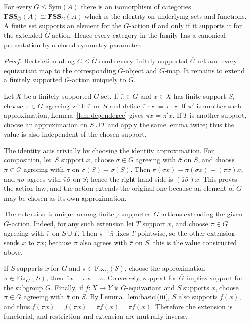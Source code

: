 \documentclass{lmcs}
\newcommand{\Sym}{\mathrm{Sym}}
\newcommand{\Fix}{\mathrm{Fix}}
\newcommand{\FSS}{\mathbf{FSS}}
\begin{document}
\begin{thm}\label{thm:closure}
For every $G\leq\Sym(A)$ there is an isomorphism of categories
$\FSS_{\overline G}(A)\cong\FSS_G(A)$
which is the identity on underlying sets and functions. A finite set
supports an element for the $G$-action if and only if it supports it for
the extended $\overline G$-action. Hence every category in the
family has a canonical presentation by a closed symmetry parameter.
\end{thm}
\begin{proof}
Restriction along $G\leq\overline G$ sends every finitely supported
$\overline G$-set and every equivariant map to the corresponding
$G$-object and $G$-map. It remains to extend a finitely supported
$G$-action uniquely to $\overline G$.

Let $X$ be a finitely supported $G$-set. If $\bar\pi\in\overline G$
and $x\in X$ has finite support $S$, choose $\pi\in G$ agreeing with
$\bar\pi$ on $S$ and define $\bar\pi\cdot x:=\pi\cdot x$.
If $\pi'$ is another such approximation, Lemma~\ref{lem:dependence}
gives $\pi x=\pi'x$. If $T$ is another support, choose an approximation
on $S\cup T$ and apply the same lemma twice; thus the value is also
independent of the chosen support.

The identity acts trivially by choosing the identity approximation.
For composition, let~$S$ support $x$, choose $\sigma\in G$ agreeing
with $\bar\sigma$ on $S$, and choose $\pi\in G$ agreeing with
$\bar\pi$ on $\sigma(S)=\bar\sigma(S)$. Then
$\bar\pi(\bar\sigma x)=\pi(\sigma x)=(\pi\sigma)x$,
and $\pi\sigma$ agrees with $\bar\pi\bar\sigma$ on $S$; hence the
right-hand side is $(\bar\pi\bar\sigma)x$. This proves the action
law, and the action extends the original one because an element of
$G$ may be chosen as its own approximation.

The extension is unique among finitely supported $\overline G$-actions
extending the given $G$-action. Indeed, for any such extension let
$T$ support $x$, and choose $\pi\in G$ agreeing with $\bar\pi$ on
$S\cup T$. Then $\pi^{-1}\bar\pi$ fixes $T$ pointwise, so the other
extension sends $x$ to $\pi x$; because $\pi$ also agrees with
$\bar\pi$ on $S$, this is the value constructed above.

If $S$ supports $x$ for $G$ and
$\bar\pi\in\Fix_{\overline G}(S)$, choose the approximation
$\pi\in\Fix_G(S)$; then $\bar\pi x=\pi x=x$. Conversely, support for
$\overline G$ implies support for the subgroup $G$. Finally, if
$f:X\to Y$ is $G$-equivariant and $S$ supports $x$, choose
$\pi\in G$ agreeing with $\bar\pi$ on $S$. By
Lemma~\ref{lem:basic}(iii), $S$ also supports $f(x)$, and thus
$f(\bar\pi x)=f(\pi x)=\pi f(x)=\bar\pi f(x)$.
Therefore the extension is functorial, and restriction and extension are
mutually inverse.
\end{proof}
\end{document}
